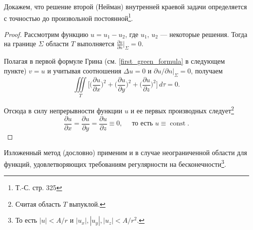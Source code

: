 \begin{theorem}
Докажем, что решение второй (Нейман) внутренней краевой задачи определяется с
точностью до произвольной постоянной\footnote{Т.-С. стр. 325}.
\end{theorem}
\begin{proof}
Рассмотрим функцию $u = u_1 - u_2$, где $u_1$, $u_2$ --- некоторые решения. Тогда на границе
$\Sigma$ области $ T $ выполняется $\frac{\partial u}{\partial n} \Big|_{\Sigma} = 0$.

Полагая в первой формуле Грина (см. \eqref{first_green_formula} в следующем пункте) $v = u$ и учитывая соотношения $\Delta u = 0$ и $\partial u / \partial n |_{\Sigma} = 0$, получаем 
\begin{equation*}
	 \iiint \limits_{T} \Bigg[\Bigg(\frac{\partial u}{\partial x}\Bigg)^2 + \Bigg(\frac{\partial u}{\partial y}\Bigg)^2 + \Bigg(\frac{\partial u}{\partial z}\Bigg)^2\Bigg] \, d\tau = 0.
\end{equation*}

Отсюда в силу непрерывности функции $u$ и ее первых производных
следует\footnote{Считая область $ T $ выпуклой.}
\begin{equation*}
	\frac{\partial u}{\partial x} = \frac{\partial u}{\partial y} = \frac{\partial
  u}{\partial z} \equiv 0, \quad \text{ то есть } u \equiv \operatorname{const}.
\end{equation*}
\end{proof}

Изложенный метод (дословно) применим и в случае неограниченной области для
функций, удовлетворяющих требованиям регулярности на бесконечности\footnote{То
есть $ |u| < A/r $ и $ |u_x|, |u_y|, |u_z| < A/r^2 $.}.


